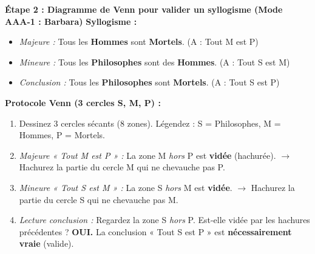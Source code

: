 \documentclass[11pt]{article}
\begin{document}
\begin{experience}
\textbf{Étape 2 : Diagramme de Venn pour valider un syllogisme (Mode AAA-1 : Barbara)}
\textbf{Syllogisme :}
\begin{itemize}
    \item \textit{Majeure :} Tous les \textbf{Hommes} sont \textbf{Mortels}. (A : Tout M est P)
    \item \textit{Mineure :} Tous les \textbf{Philosophes} sont des \textbf{Hommes}. (A : Tout S est M)
    \item \textit{Conclusion :} Tous les \textbf{Philosophes} sont \textbf{Mortels}. (A : Tout S est P)
\end{itemize}
\textbf{Protocole Venn (3 cercles S, M, P) :}
\begin{enumerate}
    \item Dessinez 3 cercles sécants (8 zones). Légendez : S = Philosophes, M = Hommes, P = Mortels.
    \item \textit{Majeure « Tout M est P » :} La zone M \emph{hors} P est \textbf{vidée} (hachurée). $\rightarrow$ Hachurez la partie du cercle M qui ne chevauche pas P.
    \item \textit{Mineure « Tout S est M » :} La zone S \emph{hors} M est \textbf{vidée}. $\rightarrow$ Hachurez la partie du cercle S qui ne chevauche pas M.
    \item \textit{Lecture conclusion :} Regardez la zone S \emph{hors} P. Est-elle vidée par les hachures précédentes ? \textbf{OUI.} La conclusion « Tout S est P » est \textbf{nécessairement vraie} (valide).
\end{enumerate}


\end{experience}
\end{document}
